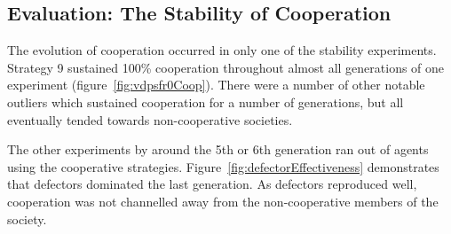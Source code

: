 \documentclass[]{final_report}
\begin{document}
\subsection{Evaluation: The Stability of Cooperation}
The evolution of cooperation occurred in only one of the stability experiments. Strategy 9 sustained 100\% cooperation throughout almost all generations of one experiment (figure~\ref{fig:vdpsfr0Coop}). There were a number of other notable outliers which sustained cooperation for a number of generations, but all eventually tended towards non-cooperative societies.\par 
The other experiments by around the 5th or 6th generation ran out of agents using the cooperative strategies. Figure~\ref{fig:defectorEffectiveness} demonstrates that defectors dominated the last generation. As defectors reproduced well, cooperation was not channelled away from the non-cooperative members of the society.
\end{document}
